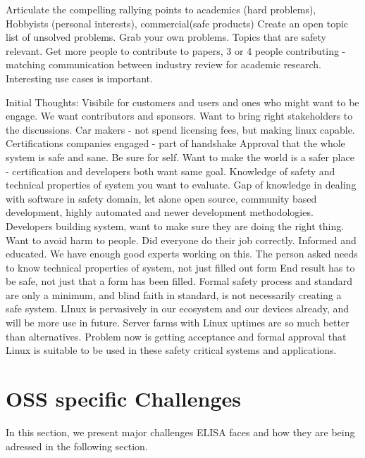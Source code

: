 \documentclass[12pt]{ElisaPaper}
\begin{document}
Articulate the compelling rallying points to 
academics (hard problems), 
Hobbyists (personal interests),
commercial(safe products)    
Create an open topic list of unsolved problems.  
Grab your own problems.   
 Topics that are safety relevant.    
 Get more people to contribute to papers,  3 or 4 people contributing - matching communication between industry review for academic research. 
Interesting use cases is important. 



Initial Thoughts:
Visibile for customers and users and ones who might want to be engage.   We want contributors and sponsors.
Want to bring right stakeholders to the discussions.
Car makers - not spend licensing fees, but making linux capable.
Certifications companies engaged - part of handshake
Approval that the whole system is safe and sane.   Be sure for self. 
Want to make the world is a safer place - certification and developers both want same goal.   Knowledge of safety and technical properties of system you want to evaluate.   Gap of knowledge in dealing with software in safety domain,  let alone open source, community based development,  highly automated and newer development methodologies.
Developers building system, want to make sure they are doing the right thing.   Want to avoid harm to people.   Did everyone do their job correctly.   Informed and educated.  We have enough good experts working on this.    
The person asked needs to know technical properties of system,  not just filled out form
End result has to be safe,  not just that a form has been filled.  Formal safety process and standard are only a minimum,  and blind faith in standard, is not necessarily creating a safe system.
LInux is pervasively in our ecosystem and our devices already,  and will be more use in future.   Server farms with Linux uptimes are so much better than alternatives.   
Problem now is getting acceptance and formal approval that Linux is suitable to be used in these safety critical systems and applications.  



\section{OSS specific Challenges}
\label{sec:OSS specific Challenges}
In this section, we present major challenges ELISA faces and how they are being adressed in the following section.
\end{document}
